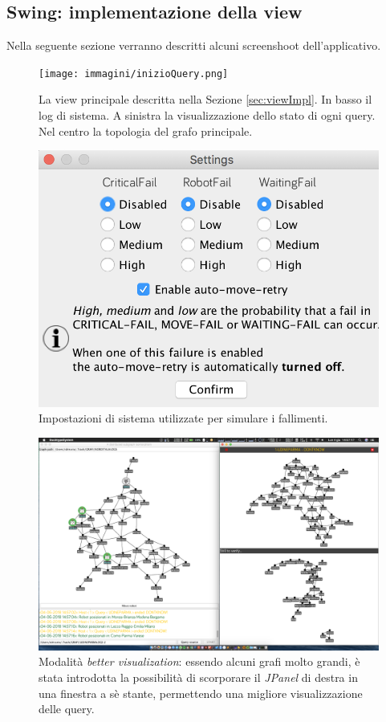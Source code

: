 \subsection{Swing: implementazione della view}
\label{sec:view}
Nella seguente sezione verranno descritti alcuni screenshoot dell'applicativo.
\begin{figure}
\hspace{-2.5cm}
\texttt{[image: immagini/inizioQuery.png]}
\caption{La view principale descritta nella Sezione \ref{sec:viewImpl}.
In basso il log di sistema. A sinistra la visualizzazione dello stato di ogni query.
Nel centro la topologia del grafo principale.}
\end{figure}
\begin{figure}
	\centering
	\includegraphics[scale=0.25]{immagini/settings.png}
	\caption{Impostazioni di sistema utilizzate per simulare i fallimenti.}
\end{figure}
\begin{figure}
	\hspace{-2.5cm}
	\includegraphics[scale=0.3]{immagini/betterVisualization.png}
	\caption{Modalità \emph{better visualization}: essendo alcuni grafi molto grandi, è stata introdotta la possibilità di scorporare il \emph{JPanel} di destra in una finestra a sè stante, permettendo una migliore visualizzazione delle query.}
\end{figure}


